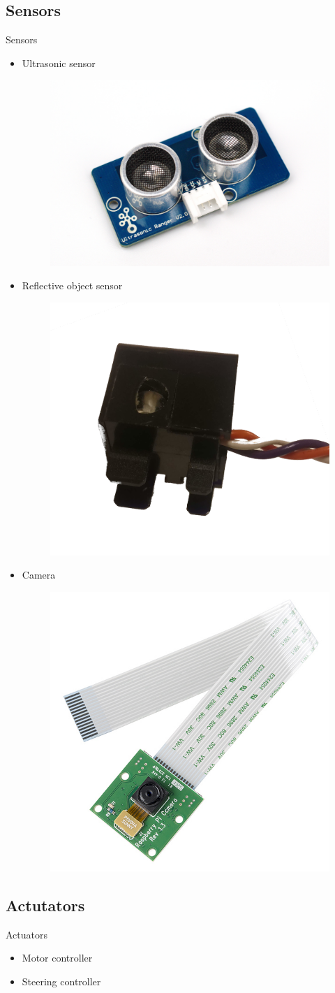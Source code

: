 \documentclass{beamer}
\begin{document}
\subsection{Sensors}
\begin{frame}{Sensors}
    \begin{itemize}
     \item Ultrasonic sensor
    \begin{figure}
        \includegraphics[width=0.2\linewidth, left]{ultrasonic.jpg}
    \end{figure}
    \item Reflective object sensor
    \begin{figure}
        \includegraphics[width=0.2\linewidth, left]{ir.jpg}
    \end{figure}
    \item Camera
    \begin{figure}
        \includegraphics[width=0.2\linewidth, left]{camera.jpg}
    \end{figure}

    \end{itemize}

\end{frame}


\subsection{Actutators}
\begin{frame}{Actuators}
 \begin{itemize}
  \item Motor controller
  \item Steering controller
 \end{itemize}

\end{frame}
\end{document}
